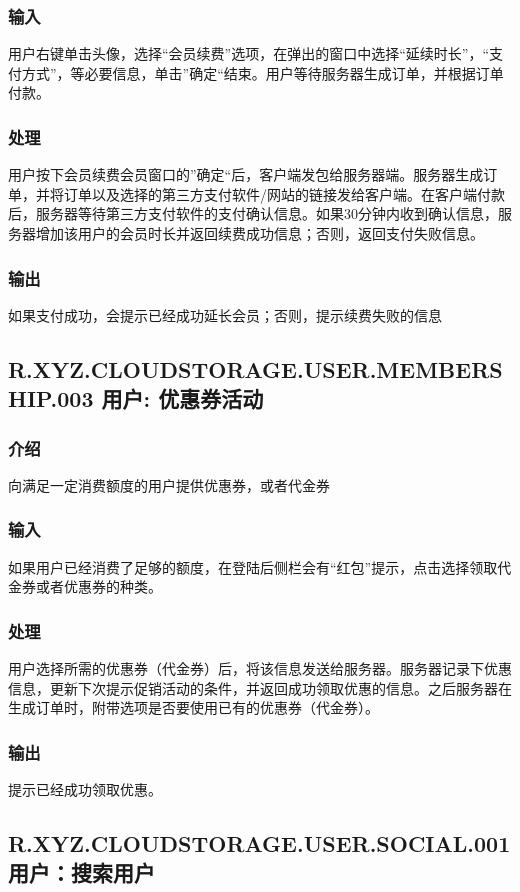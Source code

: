 {\subsubsection{输入}
用户右键单击头像，选择“会员续费”选项，在弹出的窗口中选择“延续时长”，“支付方式”，等必要信息，单击”确定“结束。用户等待服务器生成订单，并根据订单付款。
\subsubsection{处理}
用户按下会员续费会员窗口的”确定“后，客户端发包给服务器端。服务器生成订单，并将订单以及选择的第三方支付软件/网站的链接发给客户端。在客户端付款后，服务器等待第三方支付软件的支付确认信息。如果30分钟内收到确认信息，服务器增加该用户的会员时长并返回续费成功信息；否则，返回支付失败信息。
\subsubsection{输出}
如果支付成功，会提示已经成功延长会员；否则，提示续费失败的信息

\subsection{R.XYZ.CLOUDSTORAGE.USER.MEMBERSHIP.003 用户: 优惠券活动}
\subsubsection{介绍}
向满足一定消费额度的用户提供优惠券，或者代金券
\subsubsection{输入}
如果用户已经消费了足够的额度，在登陆后侧栏会有“红包”提示，点击选择领取代金券或者优惠券的种类。
\subsubsection{处理}
用户选择所需的优惠券（代金券）后，将该信息发送给服务器。服务器记录下优惠信息，更新下次提示促销活动的条件，并返回成功领取优惠的信息。之后服务器在生成订单时，附带选项是否要使用已有的优惠券（代金券）。
\subsubsection{输出}
提示已经成功领取优惠。

\subsection{R.XYZ.CLOUDSTORAGE.USER.SOCIAL.001 用户：搜索用户}
}
